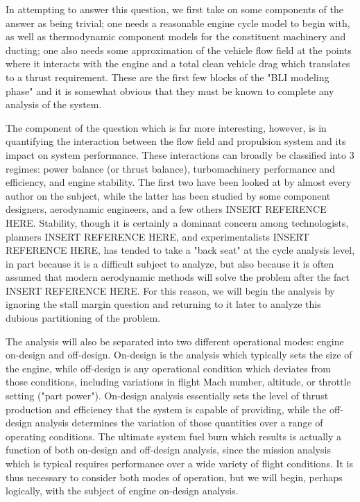 \documentclass[12pt]{gatech-thesis}
\begin{document}
In attempting to answer this question, we first take on some components of the answer as being trivial; one needs a reasonable engine cycle model to begin with, as well as thermodynamic component models for the constituent machinery and ducting;  one also needs some approximation of the vehicle flow field at the points where it interacts with the engine and a total clean vehicle drag which translates to a thrust requirement.  These are the first few blocks of the "BLI modeling phase" and it is somewhat obvious that they must be known to complete any analysis of the system.  

The component of the question which is far more interesting, however, is in quantifying the interaction between the flow field and propulsion system and its impact on system performance.  These interactions can broadly be classified into 3 regimes: power balance (or thrust balance), turbomachinery performance and efficiency, and engine stability.  The first two have been looked at by almost every author on the subject, while the latter has been studied by some component designers, aerodynamic engineers, and a few others INSERT REFERENCE HERE.  Stability, though it is certainly a dominant concern among technologists, planners INSERT REFERENCE HERE, and experimentalists INSERT REFERENCE HERE, has tended to take a "back seat" at the cycle analysis level, in part because it is a difficult subject to analyze, but also because it is often assumed that modern aerodynamic methods will solve the problem after the fact INSERT REFERENCE HERE.  For this reason, we will begin the analysis by ignoring the stall margin question and returning to it later to analyze this dubious partitioning of the problem.

The analysis will also be separated into two different operational modes: engine on-design and off-design.  On-design is the analysis which typically sets the size of the engine, while off-design is any operational condition which deviates from those conditions, including variations in flight Mach number, altitude, or throttle setting ("part power").  On-design analysis essentially sets the level of thrust production and efficiency that the system is capable of providing, while the off-design analysis determines the variation of those quantities over a range of operating conditions.  The ultimate system fuel burn which results is actually a function of both on-design and off-design analysis, since the mission analysis which is typical requires performance over a wide variety of flight conditions.  It is thus necessary to consider both modes of operation, but we will begin, perhaps logically, with the subject of engine on-design analysis.
\end{document}
